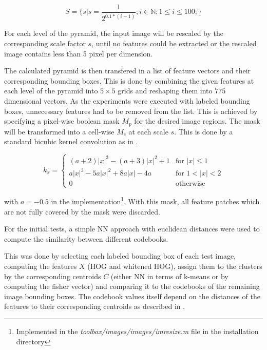 \begin{equation}
S = \{s|s = \frac{1}{2^{0.1 * (i-1)}}; i \in \mathbb{N}; 1 \le i \le 100;\}
\end{equation}

For each level of the pyramid, the input image will be rescaled by the corresponding scale factor $s$, until no features could be extracted or the rescaled image contains less than 5 pixel per dimension.
\par
The calculated pyramid is then transfered in a list of feature vectors and their corresponding bounding boxes. This is done by combining the given features at each level of the pyramid into $5\times5$ grids and reshaping them into $775$ dimensional vectors.
As the experiments were executed with labeled bounding boxes, unnecessary features had to be removed from the list. This is achieved by specifying a pixel-wise boolean mask $M_p$ for the desired image regions. The mask will be transformed into a cell-wise $M_c$ at each scale $s$. This is done by a standard bicubic kernel convolution as in .

\begin{equation}
k_x = \begin{cases}
(a+2)|x|^3-(a+3)|x|^2+1 & \text{for } |x| \leq 1 \\
a|x|^3-5a|x|^2+8a|x|-4a & \text{for } 1 < |x| < 2 \\
0                       & \text{otherwise}
\end{cases}
\label{eqn:bicubic_kernel}
\end{equation}

with $a=-0.5$ in the \MATLAB implementation\footnote{Implemented in the \textit{toolbox/images/images/imresize.m} file in the \MATLAB installation directory}. With this mask, all feature patches which are not fully covered by the mask were discarded.
\par
For the initial tests, a simple \acf{NN} approach with euclidean distances were used to compute the similarity between different codebooks.

This was done by selecting each labeled bounding box of each test image, computing the features $X$ (\ac{HOG} and whitened \ac{HOG}), assign them to the clusters by the corresponding centroids $C$ (either \ac{NN} in terms of k-means or by computing the fisher vector) and comparing it to the codebooks of the remaining image bounding boxes. The codebook values itself depend on the distances of the features to their corresponding centroids as described in .

